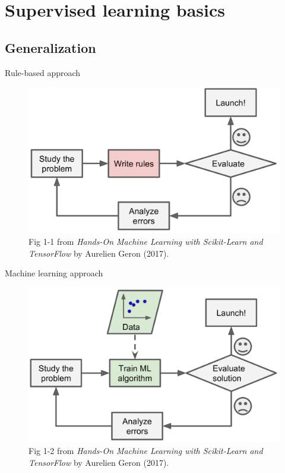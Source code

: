 \documentclass[usenames,dvipsnames,notes,11pt,aspectratio=169]{beamer}
\begin{document}
\section{Supervised learning basics}

\subsection{Generalization}
\begin{frame}
    {Rule-based approach}
\begin{figure}
\includegraphics[height=0.7\textheight]{figures/geron-fig1-1}
    \caption{{Fig 1-1 from \emph{Hands-On Machine Learning with Scikit-Learn and TensorFlow} by Aurelien Geron (2017).}}
\end{figure}
\end{frame}

\begin{frame}
    {Machine learning approach}
\begin{figure}
\includegraphics[height=0.7\textheight]{figures/geron-fig1-2}
    \caption{{Fig 1-2 from \emph{Hands-On Machine Learning with Scikit-Learn and TensorFlow} by Aurelien Geron (2017).}}
\end{figure}
\end{frame}
\end{document}

